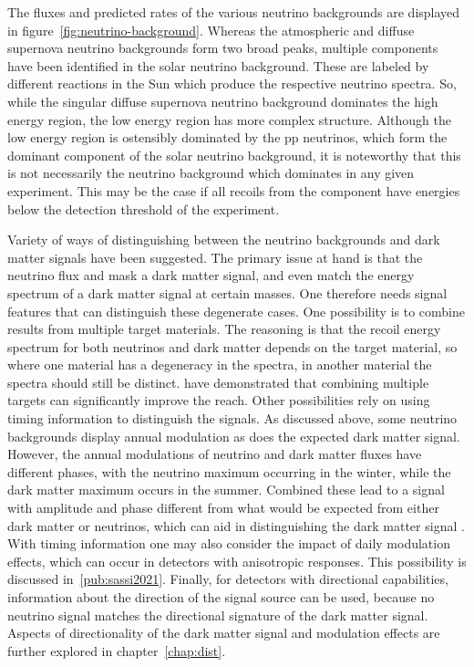 \documentclass[b5paper, 10pt, twoside]{book}
\begin{document}
The fluxes and predicted rates of the various neutrino backgrounds are displayed in figure~\ref{fig:neutrino-background}. Whereas the atmospheric and diffuse supernova neutrino backgrounds form two broad peaks, multiple components have been identified in the solar neutrino background. These are labeled by different reactions in the Sun which produce the respective neutrino spectra. So, while the singular diffuse supernova neutrino background dominates the high energy region, the low energy region has more complex structure. Although the low energy region is ostensibly dominated by the pp neutrinos, which form the dominant component of the solar neutrino background, it is noteworthy that this is not necessarily the neutrino background which dominates in any given experiment. This may be the case if all recoils from the component have energies below the detection threshold of the experiment.

Variety of ways of distinguishing between the neutrino backgrounds and dark matter signals have been suggested. The primary issue at hand is that the neutrino flux and mask a dark matter signal, and even match the energy spectrum of a dark matter signal at certain masses. One therefore needs signal features that can distinguish these degenerate cases. One possibility is to combine results from multiple target materials. The reasoning is that the recoil energy spectrum for both neutrinos and dark matter depends on the target material, so where one material has a degeneracy in the spectra, in another material the spectra should still be distinct. \textcite{BillardFigueroaFelicianoStrigari2014} have demonstrated that combining multiple targets can significantly improve the reach. Other possibilities rely on using timing information to distinguish the signals. As discussed above, some neutrino backgrounds display annual modulation as does the expected dark matter signal. However, the annual modulations of neutrino and dark matter fluxes have different phases, with the neutrino maximum occurring in the winter, while the dark matter maximum occurs in the summer. Combined these lead to a signal with amplitude and phase different from what would be expected from either dark matter or neutrinos, which can aid in distinguishing the dark matter signal \parencite{Davis2015}. With timing information one may also consider the impact of daily modulation effects, which can occur in detectors with anisotropic responses. This possibility is discussed in~\ref{pub:sassi2021}. Finally, for detectors with directional capabilities, information about the direction of the signal source can be used, because no neutrino signal matches the directional signature of the dark matter signal. Aspects of directionality of the dark matter signal and modulation effects are further explored in chapter~\ref{chap:dist}.
\end{document}
